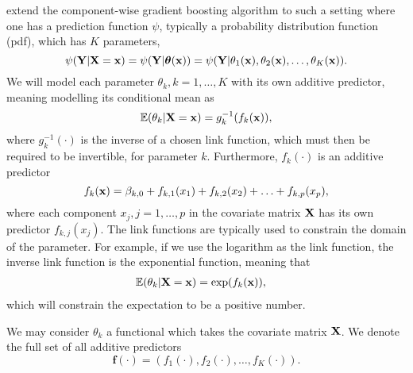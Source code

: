 \citet{schmid} extend the component-wise gradient boosting algorithm \citep{friedman2001} to such a setting where one has a prediction function $\psi$, typically a probability distribution function (pdf), which has $K$ parameters,
\begin{equation}
    \psi(\mathbf{Y}|\mathbf{X}=\mathbf{x})=\psi(\mathbf{Y}|\boldsymbol{\theta}(\mathbf{x}))=\psi(\mathbf{Y}|\theta_1(\mathbf{x}),\theta_2(\mathbf{x}),\ldots,\theta_K(\mathbf{x})).
\end{equation}
We will model each parameter $\theta_k,k=1,\ldots,K$ with its own additive predictor, meaning modelling its conditional mean as
\begin{equation}
    \mathbb{E}(\theta_k|\mathbf{X}=\mathbf{x})=g_k^{-1}(f_k(\mathbf{x})),
\end{equation}
where $g_k^{-1}(\cdot)$ is the inverse of a chosen link function, which must then be required to be invertible, for parameter $k$. Furthermore, $f_k(\cdot)$ is an additive predictor
\begin{equation}
    f_k(\mathbf{x})=\beta_{k,0}+f_{k,1}(x_1)+f_{k,2}(x_2)+\ldots+f_{k,p}(x_p),
\end{equation}
where each component $x_j,j=1,\ldots,p$ in the covariate matrix $\mathbf{X}$ has its own predictor $f_{k,j}(x_j)$. The link functions are typically used to constrain the domain of the parameter. For example, if we use the logarithm as the link function, the inverse link function is the exponential function, meaning that
\begin{align*}
    \mathbb{E}(\theta_k|\mathbf{X}=\mathbf{x})&=\exp(f_k(\mathbf{x})),
\end{align*}
which will constrain the expectation to be a positive number.

We may consider $\theta_k$ a functional which takes the covariate matrix $\mathbf{X}$. We denote the full set of all additive predictors
\begin{equation}
    \mathbf{f}(\cdot)=\left(f_1(\cdot),f_2(\cdot),\ldots,f_K(\cdot)\right).
\end{equation}


